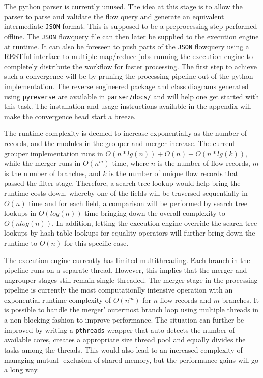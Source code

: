 The python parser is currently unused. The idea at this stage is to allow the
parser to parse and validate the flow query and generate an equivalent
intermediate \texttt{JSON} format. This is supposed to be a preprocessing step
performed offline. The \texttt{JSON} flowquery file can then later be supplied
to the execution engine at runtime.  It can also be foreseen to push parts of
the \texttt{JSON} flowquery using a RESTful interface to  multiple map/reduce jobs running the execution engine to
completely distribute the workflow for faster processing. The first step to
achieve such a convergence will be by pruning the processing pipeline out of
the python implementation. The reverse engineered package and class diagrams
generated using \texttt{pyreverse} are available in \texttt{parser/docs/} and
will help one get started with this task. The installation and usage
instructions available in the appendix will make the convergence head start a
breeze.




The runtime complexity is deemed to increase exponentially as the number of
records, and the modules in the grouper and merger increase.  The current
grouper implementation runs in $O(n*lg(n)) + O(n) + O(n*lg(k))$, while the
merger runs in $O(n^m)$ time, where $n$ is the number of flow records, $m$ is
the number of branches, and $k$ is the number of unique flow records that
passed the filter stage. Therefore, a search tree lookup would help bring the
runtime costs down, whereby  one
of the fields will be traversed sequentially in $O(n)$ time and for each
field, a comparison will be performed by search tree lookups in $O(log(n))$
time bringing down the overall complexity to $O(nlog(n))$. In addition,
letting the execution engine override the search tree lookups by hash table
lookups for equality operators will further bring down the runtime to $O(n)$
for this specific case.





The execution engine currently has limited multithreading. Each branch in the
pipeline runs on a separate thread. However, this implies that the merger and
ungrouper stages still remain single-threaded. The merger stage in the
processing pipeline is currently the most computationlly intensive operation
with an exponential runtime complexity  of
$O(n^m)$ for $n$ flow records and $m$ branches. It is possible to handle the
merger' outermost branch loop using multiple threads in a non-blocking fashion
to improve performance. The situation can further be improved by writing a
\texttt{pthreads} wrapper that auto detects the number of available cores,
creates a appropriate size thread pool and equally divides the tasks among the
threads. This would also lead to an increased complexity of managing mutual
-exclusion of shared memory, but the performance gains will go a long way.






